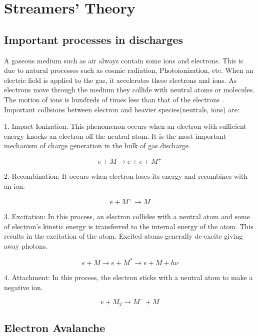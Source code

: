 \documentclass{article}
\begin{document}
\section{Streamers' Theory}

\subsection{Important processes in discharges}
A gaseous medium such as air always contain some ions and electrons. This is due to natural processes such as cosmic radiation, Photoionization, etc. When an electric field is applied to the gas, it accelerates these electrons and ions. As electrons move through the medium they collide with neutral atoms or molecules. The motion of ions is hundreds of times less than that of the electrons \cite{Raizer1991GasRazryada}. Important collisions between electron and heavier species(neutrals, ions) are:

1. Impact Ionization:
    This phenomenon occurs when an electron with sufficient energy knocks an electron off the neutral atom. It is the most important mechanism of charge generation in the bulk of gas discharge.
    
\begin{equation}
e + M \rightarrow e + e + M^+
\end{equation}


2. Recombination:
           It occurs when electron loses its energy and recombines with an ion.

\begin{equation}
e + M^+ \rightarrow M
\end{equation}

3. Excitation:
           In this process, an electron collides with a neutral atom and some of electron's kinetic energy is transferred to the internal energy of the atom. This results in the excitation of the atom. Excited atoms generally de-excite giving away photons.

\begin{equation}
e + M \rightarrow e + M^* \rightarrow e + M + h\nu
\end{equation}

4. Attachment:
            In this process, the electron sticks with a neutral atom to make a negative ion.

\begin{equation}
e + M_2 \rightarrow M^- + M
\end{equation}

\subsection{Electron Avalanche}
\end{document}
